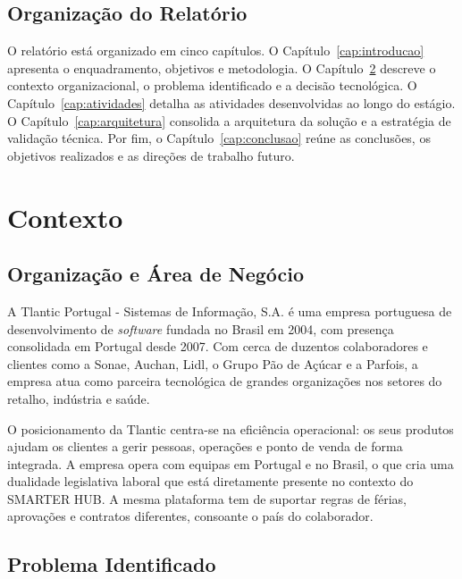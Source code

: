 \documentclass[12pt, a4paper, twoside, openright]{report}
\begin{document}
\section{Organização do Relatório}

O relatório está organizado em cinco capítulos. O Capítulo~\ref{cap:introducao} apresenta
o enquadramento, objetivos e metodologia. O Capítulo~\ref{cap:contexto} descreve o
contexto organizacional, o problema identificado e a decisão tecnológica. O
Capítulo~\ref{cap:atividades} detalha as atividades desenvolvidas ao longo do estágio.
O Capítulo~\ref{cap:arquitetura} consolida a arquitetura da solução e a estratégia de
validação técnica. Por fim, o Capítulo~\ref{cap:conclusao} reúne as conclusões, os
objetivos realizados e as direções de trabalho futuro.

\chapter{Contexto}
\label{cap:contexto}

\section{Organização e Área de Negócio}

A Tlantic Portugal - Sistemas de Informação, S.A. é uma empresa portuguesa de
desenvolvimento de \textit{software} fundada no Brasil em 2004, com presença consolidada
em Portugal desde 2007. Com cerca de duzentos colaboradores e clientes como a Sonae,
Auchan, Lidl, o Grupo Pão de Açúcar e a Parfois, a empresa atua como parceira
tecnológica de grandes organizações nos setores do retalho, indústria e saúde.

O posicionamento da Tlantic centra-se na eficiência operacional: os seus produtos ajudam
os clientes a gerir pessoas, operações e ponto de venda de forma integrada. A empresa
opera com equipas em Portugal e no Brasil, o que cria uma dualidade legislativa laboral
que está diretamente presente no contexto do SMARTER HUB. A mesma plataforma
tem de suportar regras de férias, aprovações e contratos diferentes, consoante o país do
colaborador.

\section{Problema Identificado}
\end{document}
